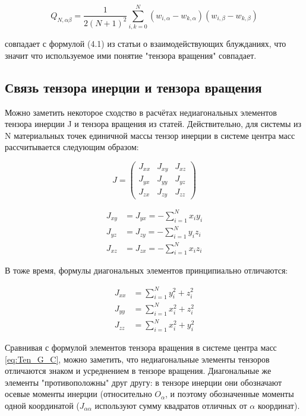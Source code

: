 \begin{equation}
    Q_{N,\alpha\beta} = \frac{1}{2(N+1)^{2}} \sum^{N}_{i,k=0}(w_{i,\alpha} - w_{k, \alpha})(w_{i,\beta} - w_{k, \beta})
\end{equation}

совпадает с формулой (4.1) из статьи о взаимодействующих блужданиях\cite{caracciolo2011geometrical}, что значит что используемое ими понятие "тензора вращения" совпадает.

\subsection{Связь тензора инерции и тензора вращения}

Можно заметить некоторое сходство в расчётах недиагональных элементов тензора инерции J и тензора вращения из статей\cite{caracciolo2011geometrical, arkin2013gyration}. Действительно, для системы из N материальных точек единичной массы тензор инерции в системе центра масс рассчитывается следующим образом:

\begin{equation}
\label{eq:Ten_I_J}
    J = \left(
    \begin{array}{ccc}
        J_{xx} & J_{xy} & J_{xz}  \\
        J_{yx} & J_{yy} & J_{yz} \\
        J_{zx} & J_{zy} & J_{zz}
    \end{array} \right)
\end{equation}

\begin{align}
    J_{xy} &= J_{yx} = -\sum_{i=1}^{N} x_{i} y_{i} \\
    J_{yz} &= J_{zy} = -\sum_{i=1}^{N} y_{i} z_{i} \\
    J_{xz} &= J_{zx} = -\sum_{i=1}^{N} x_{i} z_{i} 
\end{align}

В тоже время, формулы диагональных элементов принципиально отличаются:

\begin{align}
    J_{xx} &= \sum_{i=1}^{N} y_{i}^{2} + z_{i}^{2} \\
    J_{yy} &= \sum_{i=1}^{N} x_{i}^{2} + z_{i}^{2} \\
    J_{zz} &= \sum_{i=1}^{N} x_{i}^{2} + y_{i}^{2}
\end{align}

Сравнивая с формулой элементов тензора вращения в системе центра масс \eqref{eq:Ten_G_C}, можно заметить, что недиагональные элементы тензоров отличаются знаком и усреднением в тензоре вращения. Диагональные же элементы "противоположны" друг другу:
в тензоре инерции они обозначают осевые моменты инерции (относительно $O_{\alpha}$, и поэтому обозначенные моменты одной координатой ($J_{\alpha\alpha}$ используют сумму квадратов отличных от $\alpha$ координат).

